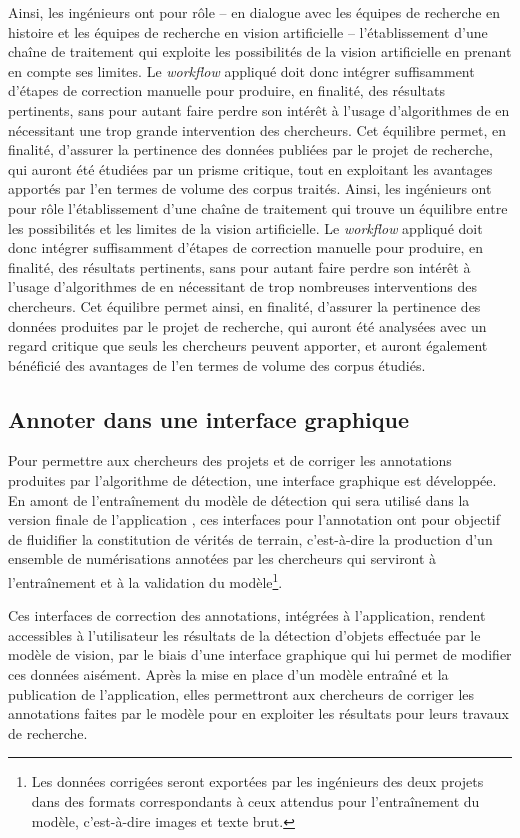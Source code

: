	Ainsi, les ingénieurs ont pour rôle -- en dialogue avec les équipes de recherche en histoire et les équipes de recherche en vision artificielle -- l'établissement d'une chaîne de traitement qui exploite les possibilités de la vision artificielle en prenant en compte ses limites. Le \textit{workflow} appliqué doit donc intégrer suffisamment d'étapes de correction manuelle pour produire, en finalité, des résultats pertinents, sans pour autant faire perdre son intérêt à l'usage d'algorithmes de \cv en nécessitant une trop grande intervention des chercheurs. Cet équilibre permet, en finalité, d'assurer la pertinence des données publiées par le projet de recherche, qui auront été étudiées par un prisme critique, tout en exploitant les avantages apportés par l'\ia en termes de volume des corpus traités.
	Ainsi, les ingénieurs ont pour rôle l'établissement d'une chaîne de traitement qui trouve un équilibre entre les possibilités et les limites de la vision artificielle. Le \textit{workflow} appliqué doit donc intégrer suffisamment d'étapes de correction manuelle pour produire, en finalité, des résultats pertinents, sans pour autant faire perdre son intérêt à l'usage d'algorithmes de \cv en nécessitant de trop nombreuses interventions des chercheurs. Cet équilibre permet ainsi, en finalité, d'assurer la pertinence des données produites par le projet de recherche, qui auront été analysées avec un regard critique que seuls les chercheurs peuvent apporter, et auront également bénéficié des avantages de l'\ia en termes de volume des corpus étudiés. 
	
\subsection{Annoter dans une interface graphique}
    Pour permettre aux chercheurs des projets \eida et \vhs de corriger les annotations produites par l'algorithme de détection, une interface graphique est développée. En amont de l'entraînement du modèle de détection qui sera utilisé dans la version finale de l'application \eida, ces interfaces pour l'annotation ont pour objectif de fluidifier la constitution de vérités de terrain, c'est-à-dire la production d'un ensemble de numérisations annotées par les chercheurs qui serviront à l'entraînement et à la validation du modèle\footnote{Les données corrigées seront exportées par les ingénieurs des deux projets dans des formats correspondants à ceux attendus pour l'entraînement du modèle, c'est-à-dire images et texte brut.}.
     
    Ces interfaces de correction des annotations, intégrées à l'application, rendent accessibles à l'utilisateur les résultats de la détection d'objets effectuée par le modèle de vision, par le biais d'une interface graphique qui lui permet de modifier ces données aisément. Après la mise en place d'un modèle entraîné et la publication de l'application, elles permettront aux chercheurs de corriger les annotations faites par le modèle pour en exploiter les résultats pour leurs travaux de recherche.
    
